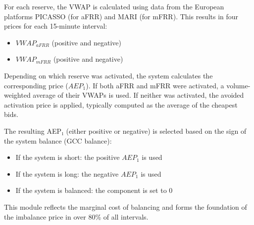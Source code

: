 \documentclass[class=scrbook, crop=false]{standalone}
\begin{document}
For each reserve, the \gls{VWAP} is calculated using data from the European platforms PICASSO (for \gls{aFRR}) and MARI (for \gls{mFRR}).
This results in four prices for each 15-minute interval:
\begin{itemize}
\item $VWAP_{aFRR}$ (positive and negative)
\item $VWAP_{mFRR}$ (positive and negative)
\end{itemize}

Depending on which reserve was activated, the system calculates the corresponding price ($AEP_1$). If both \gls{aFRR} and \gls{mFRR} were activated, a volume-weighted average of their \gls{VWAP}s is used.
If neither was activated, the avoided activation price is applied, typically computed as the average of the cheapest bids.

The resulting AEP₁ (either positive or negative) is selected based on the sign of the system balance (GCC balance):
\begin{itemize}
\item If the system is short: the positive $AEP_1$ is used
\item If the system is long: the negative $AEP_1$ is used
\item If the system is balanced: the component is set to 0
\end{itemize}
This module reflects the marginal cost of balancing and forms the foundation of the imbalance price in over 80\% of all intervals.





\end{document}
